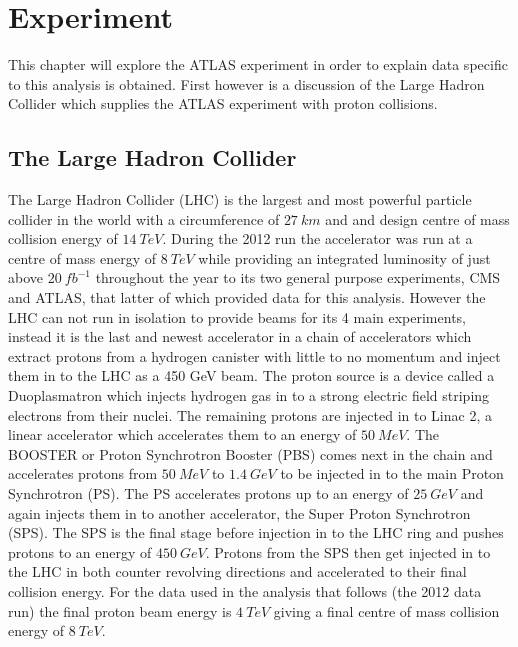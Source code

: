 \chapter{Experiment}

	This chapter will explore the ATLAS experiment in order to explain data specific to this analysis is obtained. First however is a discussion of the Large Hadron Collider which supplies the ATLAS experiment with proton collisions.

\section{The Large Hadron Collider}

	The Large Hadron Collider (LHC) is the largest and most powerful particle collider in the world with a circumference of $27~km$ and and design centre of mass collision energy of $14~TeV$. During the 2012 run the accelerator was run at a centre of mass energy of $8~TeV$ while providing an integrated luminosity of just above $20~fb^{-1}$ throughout the year to its two general purpose experiments, CMS and ATLAS, that latter of which provided data for this analysis.
	However the LHC can not run in isolation to provide beams for its 4 main experiments, instead it is the last and newest accelerator in a chain of accelerators which extract protons from a hydrogen canister with little to no momentum and inject them in to the LHC as a 450 GeV beam.
	The proton source is a device called a Duoplasmatron which injects hydrogen gas in to a strong electric field striping electrons from their nuclei. The remaining protons are injected in to Linac 2, a linear accelerator which accelerates them to an energy of $50~MeV$. The BOOSTER or Proton Synchrotron Booster (PBS) comes next in the chain and accelerates protons from $50~MeV$ to $1.4~GeV$ to be injected in to the main Proton Synchrotron (PS). The PS accelerates protons up to an energy of $25~GeV$ and again injects them in to another accelerator, the Super Proton Synchrotron (SPS). The SPS is the final stage before injection in to the LHC ring and pushes protons to an energy of $450~GeV$. Protons from the SPS then get injected in to the LHC in both counter revolving directions and accelerated to their final collision energy. For the data used in the analysis that follows (the 2012 data run) the final proton beam energy is $4~TeV$ giving a final centre of mass collision energy of $8~TeV$.

